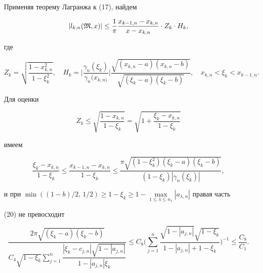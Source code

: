 Применяя теорему Лагранжа к (17), найдем


\begin{equation}


|l_{k,n}(\frak M,x)|\le\frac{1}{\pi}


\frac{x_{k-1,n}-x_{k,n}}{x-x_{k,n}}\cdot Z_k\cdot H_k,


\end{equation}


где


$$


Z_k=\sqrt{\frac{1-x^2_{k,n}}{1-\xi^2_k}},\quad


H_k=\biggl|\frac{\gamma_n(\xi_k)}{\gamma_n(x_{k,n)}} \biggr|


\frac{\sqrt{(x_{k,n}-a)(x_{k,n}-b)}}


{\sqrt{(\xi_k-a)(\xi_k-b)}},\quad x_{k,n}<\xi_k<x_{k-1,n}.


$$


Для оценки


\begin{equation}


Z_k\le\sqrt{\frac{1-x_{k,n}}{1-\xi_k}}=


\sqrt{1+\frac{\xi_k-x_{k,n}}{1-\xi_k}}


\end{equation}


имеем


\begin{equation}


\frac{\xi_k-x_{k,n}}{1-\xi_k}\le


\frac{x_{k-1,n}-x_{k,n}}{1-\xi_k}\le


\frac{\pi\sqrt{(1-\xi^2_k)(\xi_k-a)(\xi_k-b)}}


{(1-\xi_k)|\gamma_n(\xi_k)|},


\end{equation}


и при $\min((1-b)/2,\,1/2)\ge 1-\xi_k\ge 1-


\max\limits_{1\le\lambda\le n_1}|a_{\lambda,n}|$ правая часть


(20) не превосходит


\begin{equation}


\frac{2\pi\sqrt{(\xi_k-a)(\xi_k-b)}}


{C_4\sqrt{1-\xi_k}\displaystyle\sum\limits^n_{j=1}


\dfrac{|\xi_k-c_{j,n}|\sqrt{1-|a_{j,n}|}}{1-|a_{j,n}|\xi_k}}\le


C_8\biggl(\sum^n_{j=1}\frac{\sqrt{1-|a_{j,n}|}\sqrt{1-\xi_k}}


{1-|a_{j,n}|+1-\xi_k}\biggr)^{-1}\le\frac{C_8}{C_1}.


\end{equation}


